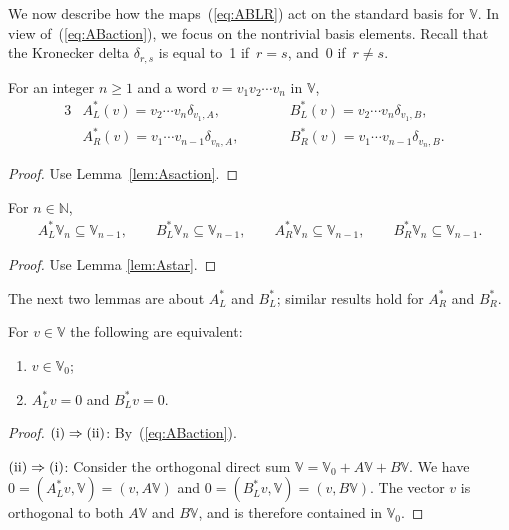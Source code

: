 We now describe how the maps~(\ref{eq:ABLR})
act on the standard basis for $\mathbb V$.
In view of~(\ref{eq:ABaction}),
we focus on the nontrivial basis elements.
Recall that the Kronecker delta $\delta_{r,s}$ is equal to~1 if~$r=s$, and~0 if~$r\not=s$.
\begin{Lemma}
\label{lem:Astar}
For an integer $n\geq 1$ and a word
$v=v_1v_2\cdots v_n$ in $\mathbb V$,
\begin{alignat*}{3}
& A^*_L(v) =v_2\cdots v_n \delta_{v_1, A},
\qquad && B^*_L(v) =v_2\cdots v_n \delta_{v_1, B},& \\
& A^*_R(v) =v_1\cdots v_{n-1} \delta_{v_n, A},\qquad &&
B^*_R(v) = v_1\cdots v_{n-1} \delta_{v_n, B}.&
\end{alignat*}
\end{Lemma}
\begin{proof} Use Lemma~\ref{lem:Asaction}.
\end{proof}
\begin{Lemma}\label{lem:ABsLower}
For $n \in \mathbb N$,
\begin{gather*}
A^*_L {\mathbb V}_n \subseteq {\mathbb V}_{n-1}, \qquad
B^*_L {\mathbb V}_n \subseteq {\mathbb V}_{n-1}, \qquad
A^*_R {\mathbb V}_n \subseteq {\mathbb V}_{n-1}, \qquad
B^*_R {\mathbb V}_n \subseteq {\mathbb V}_{n-1}.
\end{gather*}
\end{Lemma}
\begin{proof} Use Lemma
\ref{lem:Astar}.
\end{proof}

The next two lemmas are about $A^*_L$ and $B^*_L$; similar results
hold for $A^*_R$ and $B^*_R$.
\begin{Lemma}\label{lem:ABKer}
For $v \in \mathbb V$ the following are equivalent:
\begin{enumerate}\itemsep=0pt
\item[\rm (i)] $v \in {\mathbb V}_0$;
\item[\rm (ii)] $A^*_L v=0$ and $B^*_L v = 0$.
\end{enumerate}
\end{Lemma}
\begin{proof}${\rm (i)} \Rightarrow {\rm (ii)}$: By~(\ref{eq:ABaction}).

${\rm (ii)} \Rightarrow {\rm (i)}$: Consider the orthogonal
direct sum $\mathbb V= \mathbb V_0 + A\mathbb V + B \mathbb V$.
We have $0 = (A^*_Lv, \mathbb V) = (v, A\mathbb V)$ and
$0 = (B^*_Lv, \mathbb V) = (v, B\mathbb V)$.
The vector $v$ is orthogonal to both
$A\mathbb V$ and $B\mathbb V$, and is therefore contained in $\mathbb V_0$.
\end{proof}

